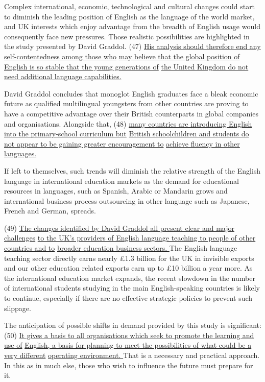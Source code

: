 \documentclass[UTF8,11pt]{ctexart}
\begin{document}
Complex international, economic, technological and cultural changes could start to diminish the leading position of English as the language of the world market, and UK interests which enjoy advantage from the breadth of English usage would consequently face new pressures. Those realistic possibilities are highlighted in the study presented by David Graddol. (47) \uline{His analysis should therefore end any self-contentedness among those who} \uline{may believe that the global position of English is so stable that the young generations of} \uline{the United Kingdom do not need additional language capabilities.}


David Graddol concludes that monoglot English graduates face a bleak economic future as qualified multilingual youngsters from other countries are proving to have a competitive advantage over their British counterparts in global companies and organisations. Alongside that, (48) \uline{many countries are introducing English into the primary-school curriculum but} \uline{British schoolchildren and students do not appear to be gaining greater encouragement to} \uline{achieve fluency in other languages.}


If left to themselves, such trends will diminish the relative strength of the English language in international education markets as the demand for educational resources in languages, such as Spanish, Arabic or Mandarin grows and international business process outsourcing in other language such as Japanese, French and German, spreads.


(49) \uline{The changes identified by David Graddol all present clear and major challenges} \uline{to the UK’s providers of English language teaching to people of other countries and to} \uline{broader education business sectors. }The English language teaching sector directly earns nearly £1.3 billion for the UK in invisible exports and our other education related exports earn up to £10 billion a year more. As the international education market expands, the recent slowdown in the number of international students studying in the main English-speaking countries is likely to continue, especially if there are no effective strategic policies to prevent such slippage.


The anticipation of possible shifts in demand provided by this study is significant: (50) \uline{It gives a basis to all organisations which seek to promote the learning and use of} \uline{English, a basis for planning to meet the possibilities of what could be a very different} \uline{operating environment. }That is a necessary and practical approach. In this as in much else, those who wish to influence the future must prepare for it.
\end{document}
